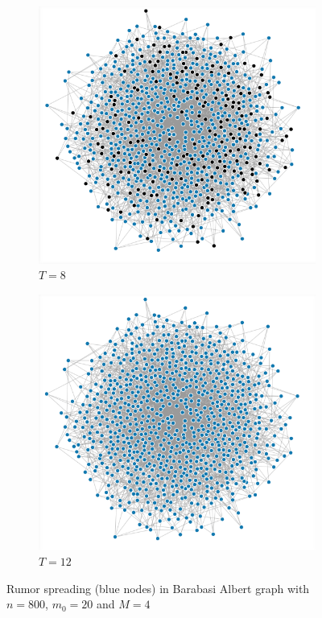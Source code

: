 \documentclass[10pt,journal,a4paper]{IEEEtran}
\begin{document}
\begin{figure}[h]
\begin{subfigure}[b]{.5\linewidth}
\includegraphics[width=1\linewidth]{figs/barabasi-albert-8}
\caption{$T=8$}
\end{subfigure}%
\begin{subfigure}[b]{.5\linewidth}
\includegraphics[width=1\linewidth]{figs/barabasi-albert-12}
\caption{$T=12$}
\end{subfigure}

\caption{Rumor spreading (blue nodes) in Barabasi Albert graph with $n=800$, $m_0 = 20$ and $M = 4$}
\label{barabasi-albert-graphs}
\end{figure}
\end{document}
